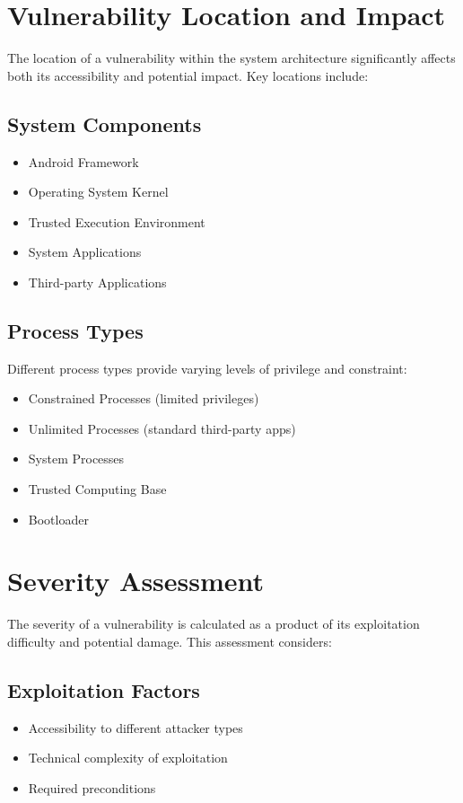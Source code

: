 \documentclass{article}
\begin{document}
\section{Vulnerability Location and Impact}
The location of a vulnerability within the system architecture significantly affects both its accessibility and potential impact. Key locations include:

\subsection{System Components}
\begin{itemize}
    \item Android Framework
    \item Operating System Kernel
    \item Trusted Execution Environment
    \item System Applications
    \item Third-party Applications
\end{itemize}

\subsection{Process Types}
Different process types provide varying levels of privilege and constraint:
\begin{itemize}
    \item Constrained Processes (limited privileges)
    \item Unlimited Processes (standard third-party apps)
    \item System Processes
    \item Trusted Computing Base
    \item Bootloader
\end{itemize}

\section{Severity Assessment}
The severity of a vulnerability is calculated as a product of its exploitation difficulty and potential damage. This assessment considers:

\subsection{Exploitation Factors}
\begin{itemize}
    \item Accessibility to different attacker types
    \item Technical complexity of exploitation
    \item Required preconditions
\end{itemize}
\end{document}
